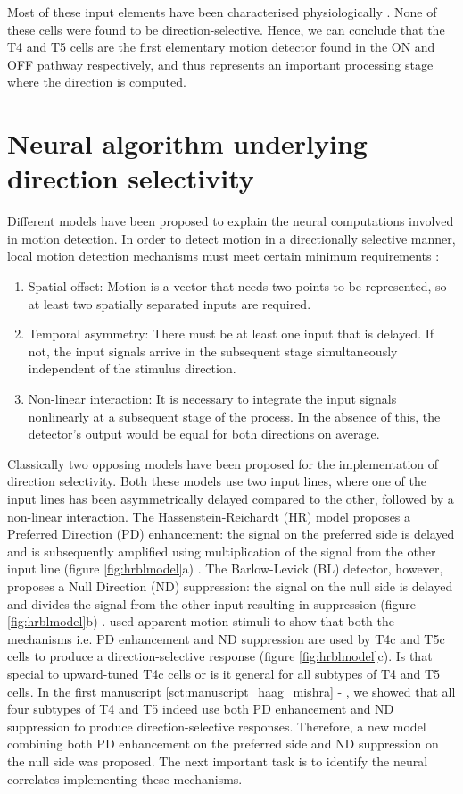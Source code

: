 Most of these input elements have been characterised physiologically \parencite{Arenz2017, Serbe2016, Strother2017, Meier2019, Borst2020, Groschner2022}. None of these cells were found to be direction-selective. Hence, we can conclude that the T4 and T5 cells are the first elementary motion detector found in the ON and OFF pathway respectively, and thus represents an important processing stage where the direction is computed.    

\section{Neural algorithm underlying direction selectivity}
Different models have been proposed to explain the neural computations involved in motion detection. In order to detect motion in a directionally selective manner, local motion detection mechanisms must meet certain minimum requirements \parencite{Borst1989}:
\begin{enumerate}
\item Spatial offset: Motion is a vector that needs two points to be represented, so at least two spatially separated inputs are required.
\item Temporal asymmetry: There must be at least one input that is delayed. If not, the input signals arrive in the subsequent stage simultaneously independent of the stimulus direction.
\item Non-linear interaction: It is necessary to integrate the input signals nonlinearly at a subsequent stage of the process. In the absence of this, the detector's output would be equal for both directions on average.
\end{enumerate} 

Classically two opposing models have been proposed for the implementation of direction selectivity. Both these models use two input lines, where one of the input lines has been asymmetrically delayed compared to the other, followed by a non-linear interaction. The Hassenstein-Reichardt (HR) model proposes a Preferred Direction (PD) enhancement: the signal on the preferred side is delayed and is subsequently amplified using multiplication of the signal from the other input line (figure \ref{fig:hrblmodel}a) \parencite{Hassenstein1956}. The Barlow-Levick (BL) detector, however, proposes a Null Direction (ND) suppression: the signal on the null side is delayed and divides the signal from the other input resulting in suppression (figure \ref{fig:hrblmodel}b) \parencite{Barlow1965}. \cite{Haag2016} used apparent motion stimuli to show that both the mechanisms i.e. PD enhancement and ND suppression are used by T4c and T5c cells to produce a direction-selective response (figure \ref{fig:hrblmodel}c). Is that special to upward-tuned T4c cells or is it general for all subtypes of T4 and T5 cells. In the first manuscript \ref{sct:manuscript_haag_mishra} - \parencite{Haag2017}, we showed that all four subtypes of T4 and T5 indeed use both PD enhancement and ND suppression to produce direction-selective responses. Therefore, a new model combining both PD enhancement on the preferred side and ND suppression on the null side was proposed. The next important task is to identify the neural correlates implementing these mechanisms. 

